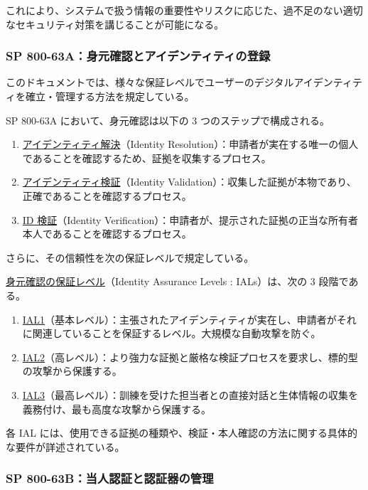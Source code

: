 \documentclass[uplatex]{jsarticle}
\def\label#1{}%
\begin{document}
これにより、システムで扱う情報の重要性やリスクに応じた、過不足のない適切なセキュリティ対策を講じることが可能になる。

\subsubsection{SP 800-63A：身元確認とアイデンティティの登録}

このドキュメントでは、様々な保証レベルでユーザーのデジタルアイデンティティを確立・管理する方法を規定している。

\begin{dfn}\label{dfn:ch5-proofing-steps}
SP 800-63A において、身元確認は以下の 3 つのステップで構成される。
\begin{enumerate}
\item \underline{アイデンティティ解決}（Identity Resolution）：申請者が実在する唯一の個人であることを確認するため、証拠を収集するプロセス。
\item \underline{アイデンティティ検証}（Identity Validation）：収集した証拠が本物であり、正確であることを確認するプロセス。
\item \underline{ID 検証}（Identity Verification）：申請者が、提示された証拠の正当な所有者本人であることを確認するプロセス。
\end{enumerate}
\end{dfn}

さらに、その信頼性を次の保証レベルで規定している。

\begin{dfn}\label{dfn:ial}
\underline{身元確認の保証レベル}（Identity Assurance Levels : IALs）は、次の 3 段階である。
\begin{enumerate}
\item \underline{IAL1}（基本レベル）：主張されたアイデンティティが実在し、申請者がそれに関連していることを保証するレベル。大規模な自動攻撃を防ぐ。
\item \underline{IAL2}（高レベル）：より強力な証拠と厳格な検証プロセスを要求し、標的型の攻撃から保護する。
\item \underline{IAL3}（最高レベル）：訓練を受けた担当者との直接対話と生体情報の収集を義務付け、最も高度な攻撃から保護する。
\end{enumerate}
\end{dfn}

各 IAL には、使用できる証拠の種類や、検証・本人確認の方法に関する具体的な要件が詳述されている。

\subsubsection{SP 800-63B：当人認証と認証器の管理}
\end{document}
